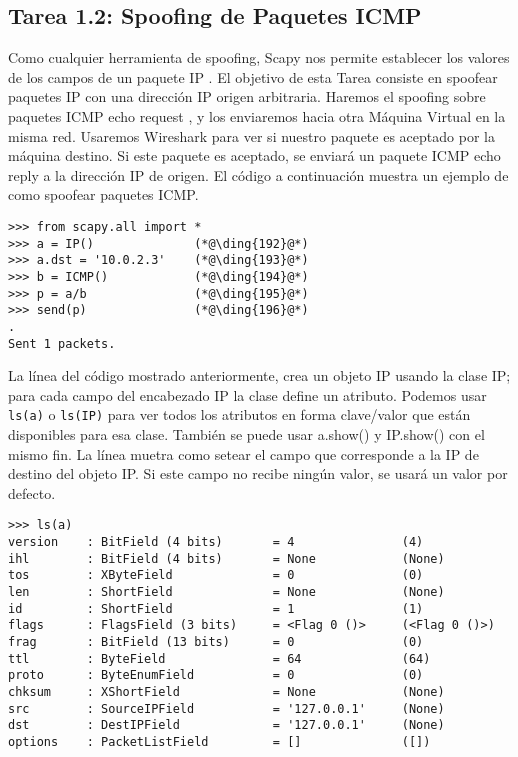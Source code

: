\subsection{Tarea 1.2: Spoofing de Paquetes ICMP}

Como cualquier herramienta de spoofing, Scapy nos permite establecer los valores de los campos de un paquete IP . El objetivo de esta Tarea consiste en spoofear paquetes IP con una dirección IP origen arbitraria.
Haremos el spoofing sobre paquetes ICMP echo request , y los enviaremos hacia otra Máquina Virtual en la misma red. Usaremos Wireshark para ver si nuestro paquete es aceptado por la máquina destino. Si este paquete es aceptado, se enviará un paquete ICMP echo reply a la dirección IP de origen.
El código a continuación muestra un ejemplo de como spoofear paquetes ICMP.

\begin{lstlisting}
>>> from scapy.all import *
>>> a = IP()              (*@\ding{192}@*)
>>> a.dst = '10.0.2.3'    (*@\ding{193}@*)
>>> b = ICMP()            (*@\ding{194}@*)
>>> p = a/b               (*@\ding{195}@*)
>>> send(p)               (*@\ding{196}@*)
.
Sent 1 packets.
\end{lstlisting}
 
La línea  del código mostrado anteriormente, crea un objeto IP usando la clase IP; para cada campo del encabezado IP la clase define un atributo. Podemos usar \texttt{ls(a)} o \texttt{ls(IP)} para ver todos los atributos en forma clave/valor que están disponibles para esa clase. También se puede usar a.show() y IP.show() con el mismo fin. La línea  muetra como setear el campo que corresponde a la IP de destino del objeto IP. Si este campo no recibe ningún valor, se usará un valor por defecto.

\begin{lstlisting}
>>> ls(a)
version    : BitField (4 bits)       = 4               (4)
ihl        : BitField (4 bits)       = None            (None)
tos        : XByteField              = 0               (0)
len        : ShortField              = None            (None)
id         : ShortField              = 1               (1)
flags      : FlagsField (3 bits)     = <Flag 0 ()>     (<Flag 0 ()>)
frag       : BitField (13 bits)      = 0               (0)
ttl        : ByteField               = 64              (64)
proto      : ByteEnumField           = 0               (0)
chksum     : XShortField             = None            (None)
src        : SourceIPField           = '127.0.0.1'     (None)
dst        : DestIPField             = '127.0.0.1'     (None)
options    : PacketListField         = []              ([])
\end{lstlisting}
 

